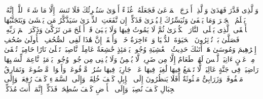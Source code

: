 \startbuffer[\q:87:3]
وَٱلَّذِی قَدَّرَ فَهَدَىٰ%
\stopbuffer%
\startbuffer[\q:87:4]
وَٱلَّذِیۤ أَخۡرَجَ ٱلۡمَرۡعَىٰ%
\stopbuffer%
\startbuffer[\q:87:5]
فَجَعَلَهُۥ غُثَاۤءً أَحۡوَىٰ%
\stopbuffer%
\startbuffer[\q:87:6]
سَنُقۡرِئُكَ فَلَا تَنسَىٰۤ%
\stopbuffer%
\startbuffer[\q:87:7]
إِلَّا مَا شَاۤءَ ٱللَّهُۚ إِنَّهُۥ یَعۡلَمُ ٱلۡجَهۡرَ وَمَا یَخۡفَىٰ%
\stopbuffer%
\startbuffer[\q:87:8]
وَنُیَسِّرُكَ لِلۡیُسۡرَىٰ%
\stopbuffer%
\startbuffer[\q:87:9]
فَذَكِّرۡ إِن نَّفَعَتِ ٱلذِّكۡرَىٰ%
\stopbuffer%
\startbuffer[\q:87:10]
سَیَذَّكَّرُ مَن یَخۡشَىٰ%
\stopbuffer%
\startbuffer[\q:87:11]
وَیَتَجَنَّبُهَا ٱلۡأَشۡقَى%
\stopbuffer%
\startbuffer[\q:87:12]
ٱلَّذِی یَصۡلَى ٱلنَّارَ ٱلۡكُبۡرَىٰ%
\stopbuffer%
\startbuffer[\q:87:13]
ثُمَّ لَا یَمُوتُ فِیهَا وَلَا یَحۡیَىٰ%
\stopbuffer%
\startbuffer[\q:87:14]
قَدۡ أَفۡلَحَ مَن تَزَكَّىٰ%
\stopbuffer%
\startbuffer[\q:87:15]
وَذَكَرَ ٱسۡمَ رَبِّهِۦ فَصَلَّىٰ%
\stopbuffer%
\startbuffer[\q:87:16]
بَلۡ تُؤۡثِرُونَ ٱلۡحَیَوٰةَ ٱلدُّنۡیَا%
\stopbuffer%
\startbuffer[\q:87:17]
وَٱلۡءَاخِرَةُ خَیۡرࣱ وَأَبۡقَىٰۤ%
\stopbuffer%
\startbuffer[\q:87:18]
إِنَّ هَٰذَا لَفِی ٱلصُّحُفِ ٱلۡأُولَىٰ%
\stopbuffer%
\startbuffer[\q:87:19]
صُحُفِ إِبۡرَٰهِیمَ وَمُوسَىٰ%
\stopbuffer%
\startbuffer[\q:88:1]
هَلۡ أَتَىٰكَ حَدِیثُ ٱلۡغَٰشِیَةِ%
\stopbuffer%
\startbuffer[\q:88:2]
وُجُوهࣱ یَوۡمَئِذٍ خَٰشِعَةٌ%
\stopbuffer%
\startbuffer[\q:88:3]
عَامِلَةࣱ نَّاصِبَةࣱ%
\stopbuffer%
\startbuffer[\q:88:4]
تَصۡلَىٰ نَارًا حَامِیَةࣰ%
\stopbuffer%
\startbuffer[\q:88:5]
تُسۡقَىٰ مِنۡ عَیۡنٍ ءَانِیَةࣲ%
\stopbuffer%
\startbuffer[\q:88:6]
لَّیۡسَ لَهُمۡ طَعَامٌ إِلَّا مِن ضَرِیعࣲ%
\stopbuffer%
\startbuffer[\q:88:7]
لَّا یُسۡمِنُ وَلَا یُغۡنِی مِن جُوعࣲ%
\stopbuffer%
\startbuffer[\q:88:8]
وُجُوهࣱ یَوۡمَئِذࣲ نَّاعِمَةࣱ%
\stopbuffer%
\startbuffer[\q:88:9]
لِّسَعۡیِهَا رَاضِیَةࣱ%
\stopbuffer%
\startbuffer[\q:88:10]
فِی جَنَّةٍ عَالِیَةࣲ%
\stopbuffer%
\startbuffer[\q:88:11]
لَّا تَسۡمَعُ فِیهَا لَٰغِیَةࣰ%
\stopbuffer%
\startbuffer[\q:88:12]
فِیهَا عَیۡنࣱ جَارِیَةࣱ%
\stopbuffer%
\startbuffer[\q:88:13]
فِیهَا سُرُرࣱ مَّرۡفُوعَةࣱ%
\stopbuffer%
\startbuffer[\q:88:14]
وَأَكۡوَابࣱ مَّوۡضُوعَةࣱ%
\stopbuffer%
\startbuffer[\q:88:15]
وَنَمَارِقُ مَصۡفُوفَةࣱ%
\stopbuffer%
\startbuffer[\q:88:16]
وَزَرَابِیُّ مَبۡثُوثَةٌ%
\stopbuffer%
\startbuffer[\q:88:17]
أَفَلَا یَنظُرُونَ إِلَى ٱلۡإِبِلِ كَیۡفَ خُلِقَتۡ%
\stopbuffer%
\startbuffer[\q:88:18]
وَإِلَى ٱلسَّمَاۤءِ كَیۡفَ رُفِعَتۡ%
\stopbuffer%
\startbuffer[\q:88:19]
وَإِلَى ٱلۡجِبَالِ كَیۡفَ نُصِبَتۡ%
\stopbuffer%
\startbuffer[\q:88:20]
وَإِلَى ٱلۡأَرۡضِ كَیۡفَ سُطِحَتۡ%
\stopbuffer%
\startbuffer[\q:88:21]
فَذَكِّرۡ إِنَّمَاۤ أَنتَ مُذَكِّرࣱ%

